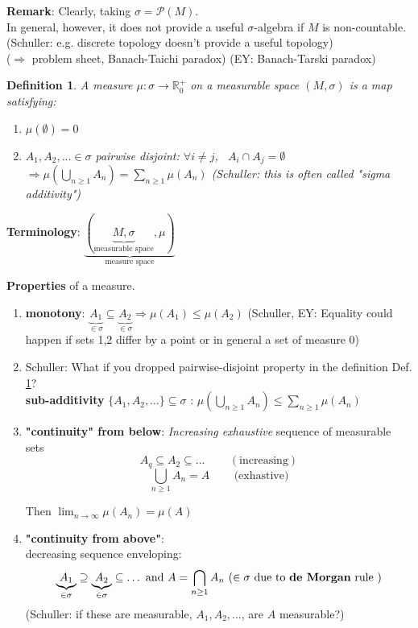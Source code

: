 \documentclass[10pt]{amsart}
\newtheorem{definition}{Definition}
\begin{document}
\begin{multicols*}{2}
\textbf{Remark}: Clearly, taking $\sigma = \mathcal{P}(M)$. \\
In general, however, it does not provide a useful $\sigma$-algebra if $M$ is non-countable. (Schuller: e.g. discrete topology doesn't provide a useful topology)  \\

($\Longrightarrow$ problem sheet, Banach-Taichi paradox) (EY: Banach-Tarski paradox)

\begin{definition}\label{Def:measure}
	A measure $\mu : \sigma \to \mathbb{R}_0^+$ on a measurable space $(M, \sigma)$ is a map satisfying:
	\begin{enumerate}
		\item[(i)] $\mu(\emptyset) = 0$
		\item[(ii)] $A_1, A_2, \dots \in \sigma$ pairwise disjoint: $\forall i \neq j$, \, $A_i \cap A_j = \emptyset$ \\
		$\Longrightarrow \mu (\bigcup_{n \geq 1} A_n ) = \sum_{n \geq 1} \mu(A_n)$ (Schuller: this is often called "sigma additivity")
	\end{enumerate}
\end{definition}

\textbf{Terminology}: $ \underbrace{ ( \underbrace{M, \sigma}_{\text{measurable space}}, \mu) }_{\text{measure space}}$

\textbf{Properties} of a measure.\label{Thm:MeasureProperties}
\begin{enumerate}
	\item[(i)] \textbf{monotony}: $\underbrace{A_1}_{\in \sigma} \subseteq \underbrace{A_2}_{\in \sigma} \Longrightarrow \mu(A_1) \leq \mu(A_2)$ (Schuller, EY: Equality could happen if sets 1,2 differ by a point or in general a set of measure 0)
	\item[(ii)] Schuller: What if you dropped pairwise-disjoint property in the definition Def. \ref{Def:measure}? \\
	\textbf{sub-additivity} $\lbrace A_1, A_2, \dots \rbrace \subseteq \sigma$ : $\mu \left( \bigcup_{n\geq 1} A_n \right) \leq \sum_{n\geq 1} \mu (A_n)$
	\item[(iii)] \textbf{"continuity" from below}: \emph{Increasing exhaustive} sequence of measurable sets
	\[
	A_q \subseteq A_2 \subseteq \dots \quad \quad \, (\text{increasing})
		\]
		\[
		\bigcup_{n \geq 1} A_n = A \quad \quad \, \text{(exhastive)}
		\]
		
		Then $\lim_{n\to \infty} \mu(A_n) = \mu(A)$
	\item[(iv)] \textbf{"continuity from above"}: \\
	decreasing sequence enveloping: 
	\[
	\underbrace{A_1}_{\in \sigma} \supseteq \underbrace{A_2}_{\in \sigma} \subseteq \dots \text{ and } A = \bigcap_{n \geq 1 } A_n \, \left( \in \sigma \text{ due to \textbf{de Morgan} rule }\right)
	\]
	(Schuller: if these are measurable, $A_1, A_2, \dots$, are $A$ measurable?)


\end{enumerate}
\end{multicols*}
\end{document}
